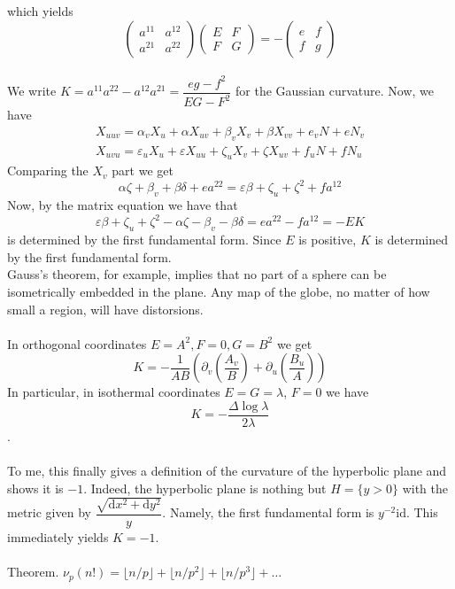 \documentclass[english]{article}
\def\d{\text{d}}
\def\lap{\Delta}
\def\id{\text{id}}
\def\eps{\varepsilon}
\newcommand\floor[1]{\lfloor{#1}\rfloor}
\begin{document}
which yields
$$\left(\begin{array}{cc}
a^{11} & a^{12}\\
a^{21} & a^{22}
\end{array}\right)\left(\begin{array}{cc}
E & F\\
F & G
\end{array}\right)=-\left(\begin{array}{cc}
e & f\\
f & g
\end{array}\right)$$\\
We write $K=a^{11}a^{22}-a^{12}a^{21}=\dfrac{eg-f^2}{EG-F^2}$ for the Gaussian curvature. Now, we have
$$\begin{array}{c}
X_{uuv}=\alpha_{v}X_{u}+\alpha X_{uv}+\beta_{v}X_{v}+\beta X_{vv}+e_{v}N+eN_{v}\\
X_{uvu}=\eps_{u}X_{u}+\eps X_{uu}+\zeta_{u}X_{v}+\zeta X_{uv}+f_{u}N+fN_{u}
\end{array}$$
Comparing the $X_v$ part we get 
$$\alpha\zeta+\beta_{v}+\beta\delta+ea^{22}=\eps\beta+\zeta_{u}+\zeta^{2}+fa^{12}$$
Now, by the matrix equation we have that
$$\eps\beta+\zeta_{u}+\zeta^{2}-\alpha\zeta-\beta_{v}-\beta\delta=ea^{22}-fa^{12}=-EK$$
is determined by the first fundamental form. Since $E$ is positive, $K$ is determined by the first fundamental form.\\
Gauss's theorem, for example, implies that no part of a sphere can be isometrically embedded in the plane. Any map of the globe, no matter of how small a region, will have distorsions.
\\\\
In orthogonal coordinates $E=A^2,F=0,G=B^2$ we get $$K=-\dfrac{1}{AB}\left(\partial_{v}\left(\dfrac{A_{v}}{B}\right)+\partial_{u}\left(\dfrac{B_{u}}{A}\right)\right)$$
In particular, 
in isothermal coordinates $E=G=\lambda$, $F=0$ we have $$K=-\dfrac{\lap \log \lambda}{2\lambda}$$.
\\\\
To me, this finally gives a definition of the curvature of the hyperbolic plane and shows it is $-1$. Indeed, the hyperbolic plane is nothing but $H=\{y>0\}$ with the metric given by $\dfrac{\sqrt{\d x^2+\d y^2}}{y}$. Namely, the first fundamental form is $y^{-2}\id$. This immediately yields $K=-1$.
\\\\
Theorem. $\nu_p(n!)=\floor{n/p}+\floor{n/p^2}+\floor{n/p^3}+\dots$
\\\\
\end{document}
